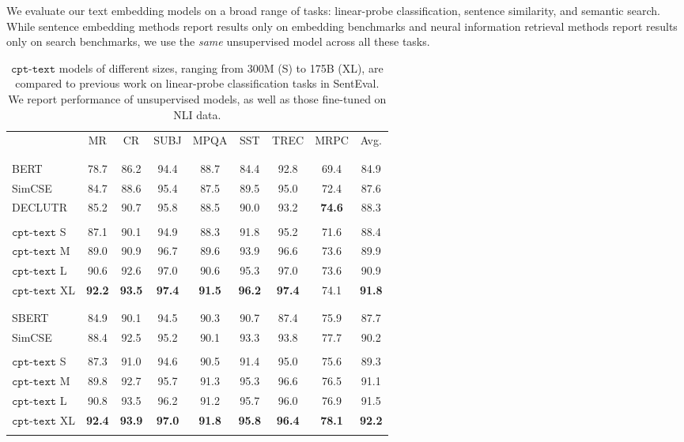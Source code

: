 \documentclass[nohyperref]{article}
\begin{document}
We evaluate our text embedding models on a broad range of tasks: linear-probe classification, sentence similarity, and semantic search. While sentence embedding \cite{sbert,simcse,declutr} methods report results only on embedding benchmarks and neural information retrieval methods \cite{ORQA, REALM, dpr, e2e, contreiver} report results only on search benchmarks, we use the \textit{same} unsupervised model across all these tasks. 

\begin{table*}
\centering
\begin{tabular}{lcccccccc}
& MR & CR & SUBJ & MPQA & SST & TREC & MRPC & Avg. \\ 
\Xhline{2.5\arrayrulewidth}
\multicolumn{9}{c}{Unsupervised} \\
\Xhline{1\arrayrulewidth} \\[-1.5ex]
BERT \cite{bert} & 78.7 & 86.2 & 94.4 & 88.7 & 84.4 & 92.8 & 69.4 & 84.9 \\
SimCSE \cite{simcse} & 84.7 & 88.6 & 95.4 & 87.5 & 89.5 & 95.0 & 72.4 & 87.6 \\
DECLUTR \cite{declutr} & 85.2 & 90.7 & 95.8 & 88.5 & 90.0 & 93.2 & \textbf{74.6} & 88.3 \\ \hline & \\[-1.5ex] 
$\texttt{cpt-text}$ S & 87.1 & 90.1 & 94.9 & 88.3 & 91.8 & 95.2 & 71.6 & 88.4 \\
$\texttt{cpt-text}$ M & 89.0 & 90.9 & 96.7 & 89.6 & 93.9 & 96.6 & 73.6 & 89.9 \\
$\texttt{cpt-text}$ L & 90.6 & 92.6 & 97.0 & 90.6 & 95.3 & 97.0 & 73.6 & 90.9 \\
$\texttt{cpt-text}$ XL & \textbf{92.2} & \textbf{93.5} & \textbf{97.4} & \textbf{91.5} & \textbf{96.2} & \textbf{97.4} & 74.1 & \textbf{91.8} \\ 
\Xhline{2.5\arrayrulewidth} 
\multicolumn{9}{c}{Transfer from NLI data} \\ 
\Xhline{1\arrayrulewidth} \\[-1.5ex]
SBERT \cite{sbert} & 84.9 & 90.1 & 94.5 & 90.3 & 90.7 & 87.4 & 75.9 & 87.7 \\
SimCSE \cite{simcse} & 88.4 & 92.5 & 95.2 & 90.1 & 93.3 & 93.8 & 77.7 & 90.2 \\ \hline & \\[-1.5ex]
$\texttt{cpt-text}$ S & 87.3 & 91.0 & 94.6 & 90.5 & 91.4 & 95.0 & 75.6 & 89.3 \\
$\texttt{cpt-text}$ M & 89.8 & 92.7 & 95.7 & 91.3 & 95.3 & 96.6 & 76.5 & 91.1 \\
$\texttt{cpt-text}$ L & 90.8 & 93.5 & 96.2 & 91.2 & 95.7 & 96.0 & 76.9 & 91.5 \\
$\texttt{cpt-text}$ XL & \textbf{92.4} & \textbf{93.9} & \textbf{97.0} & \textbf{91.8} & \textbf{95.8} & \textbf{96.4} & \textbf{78.1} & \textbf{92.2} \\
\Xhline{2.5\arrayrulewidth}
\end{tabular}
\caption{$\texttt{cpt-text}$ models of different sizes, ranging from 300M (S) to 175B (XL), are compared to previous work on linear-probe classification tasks in SentEval. We report performance of unsupervised models, as well as those fine-tuned on NLI data.}
\label{table:linear}
\end{table*}
\end{document}

